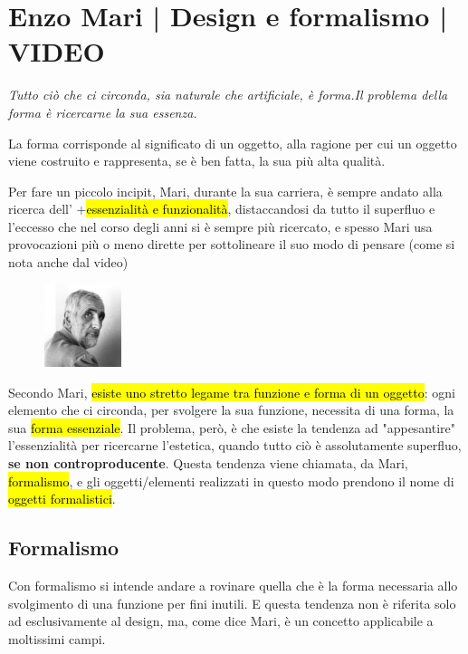 \section{Enzo Mari | Design e formalismo | VIDEO}\label{sec-mari}
\begin{fancyquotes}
{\huge \textit{Tutto ciò che ci circonda, sia naturale che artificiale, è forma.Il problema della forma è ricercarne la sua essenza.} }

    
    La forma corrisponde al significato di un oggetto, alla ragione per cui un oggetto viene costruito e rappresenta, se è ben fatta, la sua più alta qualità. 
\end{fancyquotes}

Per fare un piccolo incipit, Mari, durante la sua carriera, è sempre andato alla ricerca dell' +\hl{essenzialità e funzionalità}, distaccandosi da tutto il superfluo e l'eccesso che nel corso degli anni si è sempre più ricercato, e spesso Mari usa provocazioni più o meno dirette per sottolineare il suo modo di pensare (come si nota anche dal video)  



\begin{figure} %
    \includegraphics[width=0.2\textwidth]{blocco_1 - introduzione al corso/imgs/mari.jpg}
\end{figure}
Secondo Mari, \hl{esiste uno stretto legame tra funzione e forma di un oggetto}: ogni elemento che ci circonda, per svolgere la sua funzione, necessita di una forma, la sua \hl{forma essenziale}.
Il problema, però, è che esiste la tendenza ad "appesantire" l'essenzialità per ricercarne l'estetica, quando tutto ciò è assolutamente superfluo, \textbf{se non controproducente}.
Questa tendenza viene chiamata, da Mari, \hl{formalismo}, e gli oggetti/elementi realizzati in questo modo prendono il nome di  \hl{oggetti formalistici}.\\

\subsection{Formalismo}
Con formalismo si intende andare a rovinare quella che è la forma necessaria allo svolgimento di una funzione per fini inutili. E questa tendenza non è riferita solo ad esclusivamente al design, ma, come dice Mari, è un concetto applicabile a moltissimi campi.

